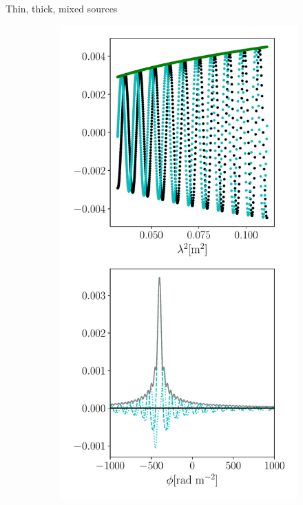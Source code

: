 \documentclass[xetex,aspectratio=169]{beamer}
\begin{document}
\begin{frame}{Thin, thick, mixed sources}

	\begin{figure}
		\centering

		\begin{subfigure}{0.2\textwidth}
			\includegraphics[width=\textwidth]{figures/sources/thin_source.pdf}

\end{subfigure}
\end{figure}
\end{frame}
\end{document}
